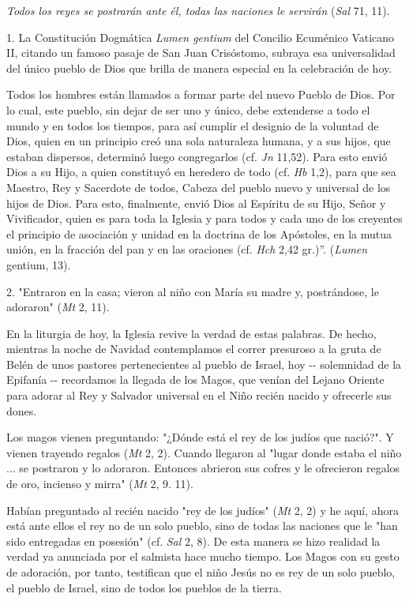 \emph{Todos los reyes se postrarán ante él, todas las naciones le
	servirán} (\emph{Sal} 71, 11).

1. La Constitución Dogmática \emph{Lumen gentium} del Concilio Ecuménico
Vaticano II, citando un famoso pasaje de San Juan Crisóstomo, subraya
esa universalidad del único pueblo de Dios que brilla de manera especial
en la celebración de hoy.

Todos los hombres están llamados a formar parte del nuevo Pueblo de
Dios. Por lo cual, este pueblo, sin dejar de ser uno y único, debe
extenderse a todo el mundo y en todos los tiempos, para así cumplir el
designio de la voluntad de Dios, quien en un principio creó una sola
naturaleza humana, y a sus hijos, que estaban dispersos, determinó luego
congregarlos (cf. \emph{Jn} 11,52). Para esto envió Dios a su Hijo, a
quien constituyó en heredero de todo (cf. \emph{Hb} 1,2), para que sea
Maestro, Rey y Sacerdote de todos, Cabeza del pueblo nuevo y universal
de los hijos de Dios. Para esto, finalmente, envió Dios al Espíritu de
su Hijo, Señor y Vivificador, quien es para toda la Iglesia y para todos
y cada uno de los creyentes el principio de asociación y unidad en la
doctrina de los Apóstoles, en la mutua unión, en la fracción del pan y
en las oraciones (cf. \emph{Hch} 2,42 gr.)''. (\emph{Lumen} gentium,
13).

2. "Entraron en la casa; vieron al niño con María su madre y,
postrándose, le adoraron" (\emph{Mt} 2, 11).

En la liturgia de hoy, la Iglesia revive la verdad de estas palabras. De
hecho, mientras la noche de Navidad contemplamos el correr presuroso a
la gruta de Belén de unos pastores pertenecientes al pueblo de Israel,
hoy -\/- solemnidad de la Epifanía -\/- recordamos la llegada de los
Magos, que venían del Lejano Oriente para adorar al Rey y Salvador
universal en el Niño recién nacido y ofrecerle sus dones.

Los magos vienen preguntando: "¿Dónde está el rey de los judíos que
nació?". Y vienen trayendo regalos (\emph{Mt} 2, 2). Cuando llegaron al
"lugar donde estaba el niño ... se postraron y lo adoraron. Entonces
abrieron sus cofres y le ofrecieron regalos de oro, incienso y mirra"
(\emph{Mt} 2, 9. 11).

Habían preguntado al recién nacido "rey de los judíos" (\emph{Mt} 2, 2)
y he aquí, ahora está ante ellos el rey no de un solo pueblo, sino de
todas las naciones que le "han sido entregadas en posesión" (cf.
\emph{Sal} 2, 8). De esta manera se hizo realidad la verdad ya anunciada
por el salmista hace mucho tiempo. Los Magos con su gesto de adoración,
por tanto, testifican que el niño Jesús no es rey de un solo pueblo, el
pueblo de Israel, sino de todos los pueblos de la tierra.

